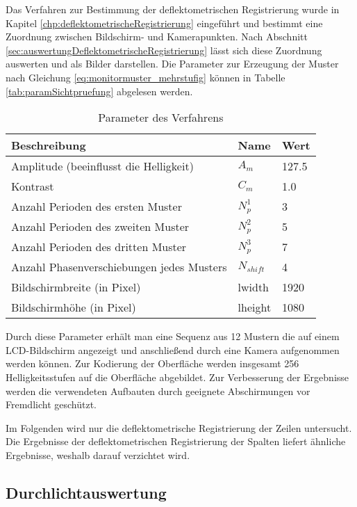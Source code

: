 Das Verfahren zur Bestimmung der deflektometrischen Registrierung wurde in Kapitel \ref{chp:deflektometrischeRegistrierung} eingeführt und bestimmt eine Zuordnung zwischen Bildschirm- und Kamerapunkten.
Nach Abschnitt \ref{sec:auswertungDeflektometrischeRegistrierung} lässt sich diese Zuordnung auswerten und als Bilder darstellen.
Die Parameter zur Erzeugung der Muster nach Gleichung \ref{eq:monitormuster_mehrstufig} können in Tabelle \ref{tab:paramSichtpruefung} abgelesen werden.

\begin{table}[H]
	\centering
	\begin{tabular}{lll}
	\hline 
	\textbf{Beschreibung} & \textbf{Name} & \textbf{Wert} \\ 
	\hline 
	Amplitude (beeinflusst die Helligkeit) & $A_m$ & 127.5 \\
	Kontrast & $C_m$ & 1.0 \\
	Anzahl Perioden des ersten Muster & $N_p^1$ & 3 \\ 
	Anzahl Perioden des zweiten Muster & $N_p^2$ & 5 \\ 
	Anzahl Perioden des dritten Muster & $N_p^3$ & 7 \\  
	Anzahl Phasenverschiebungen jedes Musters & $N_{shift}$ & 4 \\ 
	Bildschirmbreite (in Pixel) & \acrshort{lwidth} & 1920 \\
	Bildschirmhöhe (in Pixel) & \acrshort{lheight} & 1080 \\
	\hline 
	\end{tabular} 
	\caption{Parameter des Verfahrens}
	\label{tab:paramDeflektometrischRegistrierung}
\end{table}

\noindent
Durch diese Parameter erhält man eine Sequenz aus 12 Mustern die auf einem LCD-Bildschirm angezeigt und anschließend durch eine Kamera aufgenommen werden können.
Zur Kodierung der Oberfläche werden insgesamt 256 Helligkeitsstufen auf die Oberfläche abgebildet.
Zur Verbesserung der Ergebnisse werden die verwendeten Aufbauten durch geeignete Abschirmungen vor Fremdlicht geschützt.

\p
Im Folgenden wird nur die deflektometrische Registrierung der Zeilen untersucht.
Die Ergebnisse der deflektometrischen Registrierung der Spalten liefert ähnliche Ergebnisse, weshalb darauf verzichtet wird.

{
	\FloatBarrier
    \subsection{Durchlichtauswertung}
    \label{sub:durchlichtAuswertungDeflektometrischeRegistrierung}
    
}


